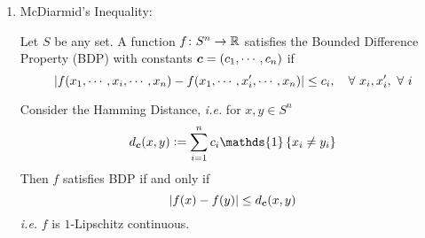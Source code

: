 \begin{enumerate}[label=\arabic{*}.]
	\item  McDiarmid's Inequality:
	\begin{defn}
	    Let $S$ be any set. A function $f \colon S^n \rightarrow \mathbb{R}$ satisfies the Bounded Difference Property (BDP) with constants $\boldsymbol{c} = (c_1,\cdots,c_n)$ if
	    \begin{equation*}
	    	\left\lvert f(x_1,\cdots,x_{i},\cdots,x_n) - f(x_1,\cdots,x^\prime_{i},\cdots,x_n)\right\lvert \leq c_i,\quad \forall~x_i,x_i^\prime,~\forall~i
	    \end{equation*}
	\end{defn}
	\begin{rmk}
	    Consider the Hamming Distance, \emph{i.e.} for $x,y \in S^n$
	    \begin{equation*}
	    	d_{\bd{c}}(x,y) \defeq \sum_{i=1}^n c_i \mathds{1}\bb{x_i \neq y_i}
	    \end{equation*}
	    Then $f$ satisfies BDP if and only if
	    \begin{equation*}
	    	\left\lvert f(x)-f(y)\right\lvert \leq d_{\boldsymbol{c}}(x,y)
	    \end{equation*}
	    \emph{i.e.} $f$ is $1$-Lipschitz continuous.
	\end{rmk}


\end{enumerate}
